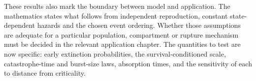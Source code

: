 These results also mark the boundary between model and application.  The
mathematics states what follows from independent reproduction, constant
state-dependent hazards and the chosen event ordering.  Whether those assumptions
are adequate for a particular population, compartment or rupture mechanism must
be decided in the relevant application chapter.  The quantities to test are now
specific: early extinction probabilities, the survival-conditioned scale,
catastrophe-time and burst-size laws, absorption times, and the sensitivity of
each to distance from criticality.
